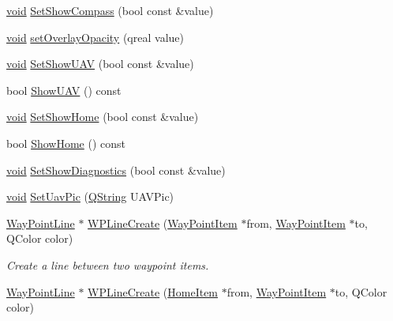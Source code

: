 \begin{DoxyCompactItemize}
\hyperlink{group___u_a_v_objects_plugin_ga444cf2ff3f0ecbe028adce838d373f5c}{void} \hyperlink{group___o_p_map_widget_ga6f97b86b2d7a7ca6f5b7bb65a70b5a96}{\-Set\-Show\-Compass} (bool const \&value)
\item 
\hyperlink{group___u_a_v_objects_plugin_ga444cf2ff3f0ecbe028adce838d373f5c}{void} \hyperlink{group___o_p_map_widget_ga989b4bdc242ebd97536cffb2be2193fc}{set\-Overlay\-Opacity} (qreal value)
\item 
\hyperlink{group___u_a_v_objects_plugin_ga444cf2ff3f0ecbe028adce838d373f5c}{void} \hyperlink{group___o_p_map_widget_ga0ced0790f99341bffe4d71cd8f1f3d61}{\-Set\-Show\-U\-A\-V} (bool const \&value)
\item 
bool \hyperlink{group___o_p_map_widget_ga07fb8db72de213248c524cae2b148d7a}{\-Show\-U\-A\-V} () const 
\item 
\hyperlink{group___u_a_v_objects_plugin_ga444cf2ff3f0ecbe028adce838d373f5c}{void} \hyperlink{group___o_p_map_widget_gaa503c30b06667b16caa4190f8fa47f86}{\-Set\-Show\-Home} (bool const \&value)
\item 
bool \hyperlink{group___o_p_map_widget_ga0479c8181e84aade1b9a3eac69daf0b6}{\-Show\-Home} () const 
\item 
\hyperlink{group___u_a_v_objects_plugin_ga444cf2ff3f0ecbe028adce838d373f5c}{void} \hyperlink{group___o_p_map_widget_gabf19ca6f76133841be5fedfff841073e}{\-Set\-Show\-Diagnostics} (bool const \&value)
\item 
\hyperlink{group___u_a_v_objects_plugin_ga444cf2ff3f0ecbe028adce838d373f5c}{void} \hyperlink{group___o_p_map_widget_ga6413251a1bea12088cdfa6d7f599ba04}{\-Set\-Uav\-Pic} (\hyperlink{group___u_a_v_objects_plugin_gab9d252f49c333c94a72f97ce3105a32d}{\-Q\-String} \-U\-A\-V\-Pic)
\item 
\hyperlink{classmapcontrol_1_1_way_point_line}{\-Way\-Point\-Line} $\ast$ \hyperlink{group___o_p_map_widget_gaf6d0234b2aa0e66f40f4da7bc3b9fb4f}{\-W\-P\-Line\-Create} (\hyperlink{classmapcontrol_1_1_way_point_item}{\-Way\-Point\-Item} $\ast$from, \hyperlink{classmapcontrol_1_1_way_point_item}{\-Way\-Point\-Item} $\ast$to, \-Q\-Color color)
\begin{DoxyCompactList}\small\item\em \-Create a line between two waypoint items. \end{DoxyCompactList}\item 
\hyperlink{classmapcontrol_1_1_way_point_line}{\-Way\-Point\-Line} $\ast$ \hyperlink{group___o_p_map_widget_gada64bfaa4e838335d8b923e9e184b373}{\-W\-P\-Line\-Create} (\hyperlink{classmapcontrol_1_1_home_item}{\-Home\-Item} $\ast$from, \hyperlink{classmapcontrol_1_1_way_point_item}{\-Way\-Point\-Item} $\ast$to, \-Q\-Color color)

\end{DoxyCompactItemize}
